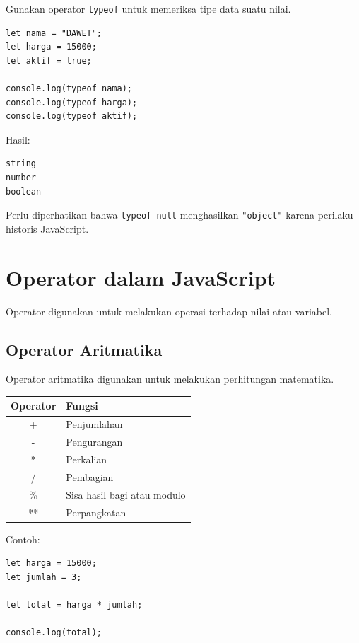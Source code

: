 \documentclass[12pt,a4paper]{article}
\begin{document}
Gunakan operator \texttt{typeof} untuk memeriksa
tipe data suatu nilai.

\begin{lstlisting}
let nama = "DAWET";
let harga = 15000;
let aktif = true;

console.log(typeof nama);
console.log(typeof harga);
console.log(typeof aktif);
\end{lstlisting}

Hasil:

\begin{lstlisting}
string
number
boolean
\end{lstlisting}

Perlu diperhatikan bahwa \texttt{typeof null}
menghasilkan \texttt{"object"} karena perilaku
historis JavaScript.

\section{Operator dalam JavaScript}

Operator digunakan untuk melakukan operasi terhadap
nilai atau variabel.

\subsection{Operator Aritmatika}

Operator aritmatika digunakan untuk melakukan
perhitungan matematika.

\begin{center}
\begin{tabularx}{\textwidth}{cX}
\toprule
\textbf{Operator} & \textbf{Fungsi} \\
\midrule
+ & Penjumlahan \\
- & Pengurangan \\
* & Perkalian \\
/ & Pembagian \\
\% & Sisa hasil bagi atau modulo \\
** & Perpangkatan \\
\bottomrule
\end{tabularx}
\end{center}

Contoh:

\begin{lstlisting}
let harga = 15000;
let jumlah = 3;

let total = harga * jumlah;

console.log(total);
\end{lstlisting}
\end{document}
